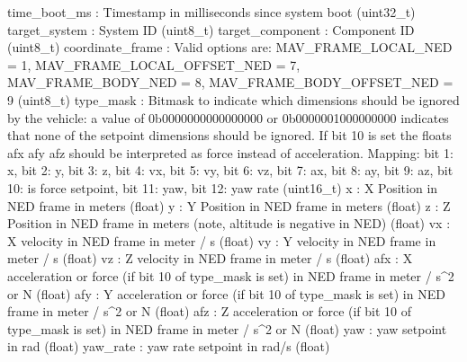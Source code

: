 \begin{DoxyVerb}
\begin{DoxyVerb}
\begin{DoxyVerb}
\begin{DoxyVerb}
\begin{DoxyVerb}
\begin{DoxyVerb}
\begin{DoxyVerb}
\begin{DoxyVerb}
\begin{DoxyVerb}
\begin{DoxyVerb}
\begin{DoxyVerb}
time_boot_ms              : Timestamp in milliseconds since system boot (uint32_t)
target_system             : System ID (uint8_t)
target_component          : Component ID (uint8_t)
coordinate_frame          : Valid options are: MAV_FRAME_LOCAL_NED = 1, MAV_FRAME_LOCAL_OFFSET_NED = 7, MAV_FRAME_BODY_NED = 8, MAV_FRAME_BODY_OFFSET_NED = 9 (uint8_t)
type_mask                 : Bitmask to indicate which dimensions should be ignored by the vehicle: a value of 0b0000000000000000 or 0b0000001000000000 indicates that none of the setpoint dimensions should be ignored. If bit 10 is set the floats afx afy afz should be interpreted as force instead of acceleration. Mapping: bit 1: x, bit 2: y, bit 3: z, bit 4: vx, bit 5: vy, bit 6: vz, bit 7: ax, bit 8: ay, bit 9: az, bit 10: is force setpoint, bit 11: yaw, bit 12: yaw rate (uint16_t)
x                         : X Position in NED frame in meters (float)
y                         : Y Position in NED frame in meters (float)
z                         : Z Position in NED frame in meters (note, altitude is negative in NED) (float)
vx                        : X velocity in NED frame in meter / s (float)
vy                        : Y velocity in NED frame in meter / s (float)
vz                        : Z velocity in NED frame in meter / s (float)
afx                       : X acceleration or force (if bit 10 of type_mask is set) in NED frame in meter / s^2 or N (float)
afy                       : Y acceleration or force (if bit 10 of type_mask is set) in NED frame in meter / s^2 or N (float)
afz                       : Z acceleration or force (if bit 10 of type_mask is set) in NED frame in meter / s^2 or N (float)
yaw                       : yaw setpoint in rad (float)
yaw_rate                  : yaw rate setpoint in rad/s (float)\end{DoxyVerb}
 \mbox{\label{classpymavlink_1_1dialects_1_1v10_1_1MAVLink_ada1793642499fb48e9bc5b6b25b7a8f3}} 

\end{DoxyVerb}
\end{DoxyVerb}
\end{DoxyVerb}
\end{DoxyVerb}
\end{DoxyVerb}
\end{DoxyVerb}
\end{DoxyVerb}
\end{DoxyVerb}
\end{DoxyVerb}
\end{DoxyVerb}
